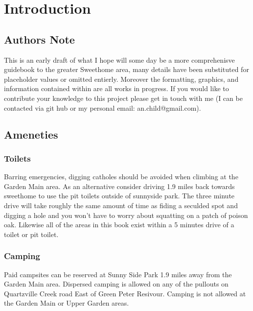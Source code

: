\chapter{Introduction}
\begin{multicols*}{2}
\lhead{\textcolor{\chapterColor}{\rule[-2pt]{\textwidth}{15pt}}}
\section{Authors Note}
This is an early draft of what I hope will some day be a more comprehenisve guidebook to the greater Sweethome area, many details have been substituted for placeholder values or omitted entierly. Moreover the formatting, graphics, and information contained within are all works in progress. If you would like to contribute your knowledge to this project please get in touch with me (I can be contacted via git hub or my personal email: an.child@gmail.com).
\section{Ameneties}
\subsection*{Toilets}
Barring emergencies, digging catholes should be avoided when climbing at the Garden Main area. As an alternative consider driving 1.9 miles back towards sweethome to use the pit toilets outside of sunnyside park. The three minute drive will take roughly the same amount of time as fiding a seculded spot and digging a hole and you won't have to worry about squatting on a patch of poison oak. Likewise all of the areas in this book exist within a 5 minutes drive of a toilet or pit toilet. 
\subsection*{Camping}
Paid campsites can be reserved at Sunny Side Park 1.9 miles away from the Garden Main area. Dispersed camping is allowed on any of the pullouts on Quartzville Creek road East of Green Peter Resivour. Camping is not allowed at the Garden Main or Upper Garden areas.

\end{multicols*}
